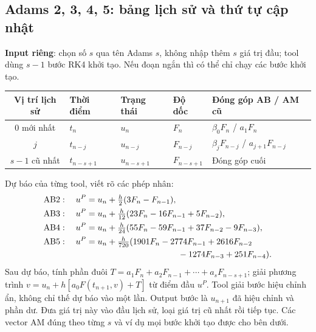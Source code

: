 \subsection{Adams 2, 3, 4, 5: bảng lịch sử và thứ tự cập nhật}
\textbf{Input riêng}: chọn số $s$ qua tên Adams $s$, không nhập thêm $s$ giá trị đầu; tool dùng $s-1$ bước RK4 khởi tạo. Nếu đoạn ngắn thì có thể chỉ chạy các bước khởi tạo.
\begin{center}\small\begin{tabular}{cllll}\toprule
Vị trí lịch sử&Thời điểm&Trạng thái&Độ dốc&Đóng góp AB / AM cũ\\\midrule
0 mới nhất&$t_n$&$u_n$&$F_n$&$\beta_0F_n$ / $a_1F_n$\\
$j$&$t_{n-j}$&$u_{n-j}$&$F_{n-j}$&$\beta_jF_{n-j}$ / $a_{j+1}F_{n-j}$\\
$s-1$ cũ nhất&$t_{n-s+1}$&$u_{n-s+1}$&$F_{n-s+1}$&Đóng góp cuối\\\bottomrule
\end{tabular}\end{center}
Dự báo của từng tool, viết rõ các phép nhân:
\begin{align*}
\mathrm{AB2}:\quad u^P&=u_n+\tfrac h2(3F_n-F_{n-1}),\\
\mathrm{AB3}:\quad u^P&=u_n+\tfrac h{12}(23F_n-16F_{n-1}+5F_{n-2}),\\
\mathrm{AB4}:\quad u^P&=u_n+\tfrac h{24}(55F_n-59F_{n-1}+37F_{n-2}-9F_{n-3}),\\
\mathrm{AB5}:\quad u^P&=u_n+\tfrac h{720}(1901F_n-2774F_{n-1}+2616F_{n-2}\\
&\hspace{38mm}-1274F_{n-3}+251F_{n-4}).
\end{align*}
Sau dự báo, tính phần đuôi $T=a_1F_n+a_2F_{n-1}+\cdots+a_sF_{n-s+1}$; giải phương trình $v=u_n+h[a_0F(t_{n+1},v)+T]$ từ điểm đầu $u^P$. Tool giải bước hiệu chỉnh ẩn, không chỉ thế dự báo vào một lần. Output bước là $u_{n+1}$ đã hiệu chỉnh và phần dư. Đưa giá trị này vào đầu lịch sử, loại giá trị cũ nhất rồi tiếp tục. Các vector AM đúng theo từng $s$ và ví dụ mọi bước khởi tạo được cho bên dưới.
